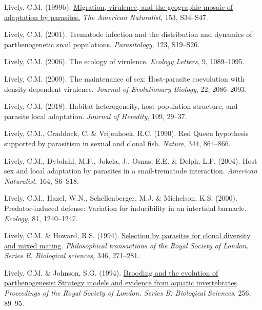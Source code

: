 \documentclass[
  letterpaper,
]{book}
\newlength{\cslhangindent}
\newenvironment{CSLReferences}[2] %
 {\begin{list}{}{%
  \setlength{\itemindent}{0pt}
  \setlength{\leftmargin}{0pt}
  \setlength{\parsep}{0pt}
  \ifodd #1
   \setlength{\leftmargin}{\cslhangindent}
   \setlength{\itemindent}{-1\cslhangindent}
  \fi
  \setlength{\itemsep}{#2\baselineskip}}}
 {\end{list}}
\begin{document}
\begin{CSLReferences}{1}{0}
Lively, C.M. (1999b). \href{https://doi.org/10.1086/303210}{Migration,
virulence, and the geographic mosaic of adaptation by parasites.}
\emph{The American Naturalist}, 153, S34--S47.

Lively, C.M. (2001). Trematode infection and the distribution and
dynamics of parthenogenetic snail populations. \emph{Parasitology}, 123,
S19--S26.

Lively, C.M. (2006). The ecology of virulence. \emph{Ecology Letters},
9, 1089--1095.

Lively, C.M. (2009). The maintenance of sex: Host-parasite coevolution
with density-dependent virulence. \emph{Journal of Evolutionary
Biology}, 22, 2086--2093.

Lively, C.M. (2018). Habitat heterogeneity, host population structure,
and parasite local adaptation. \emph{Journal of Heredity}, 109, 29--37.

Lively, C.M., Craddock, C. \& Vrijenhoek, R.C. (1990). {Red Queen}
hypothesis supported by parasitism in sexual and clonal fish.
\emph{Nature}, 344, 864--866.

Lively, C.M., Dybdahl, M.F., Jokela, J., Osnas, E.E. \& Delph, L.F.
(2004). Host sex and local adaptation by parasites in a snail-trematode
interaction. \emph{American Naturalist}, 164, S6--S18.

Lively, C.M., Hazel, W.N., Schellenberger, M.J. \& Michelson, K.S.
(2000). Predator-induced defense: Variation for inducibility in an
intertidal barnacle. \emph{Ecology}, 81, 1240--1247.

Lively, C.M. \& Howard, R.S. (1994).
\href{https://doi.org/10.1098/rstb.1994.0144}{Selection by parasites for
clonal diversity and mixed mating}. \emph{Philosophical transactions of
the Royal Society of London. Series B, Biological sciences}, 346,
271--281.

Lively, C.M. \& Johnson, S.G. (1994).
\href{https://doi.org/10.1098/rspb.1994.0054}{Brooding and the evolution
of parthenogenesis: Strategy models and evidence from aquatic
invertebrates}. \emph{Proceedings of the Royal Society of London. Series
B: Biological Sciences}, 256, 89--95.


\end{CSLReferences}
\end{document}
